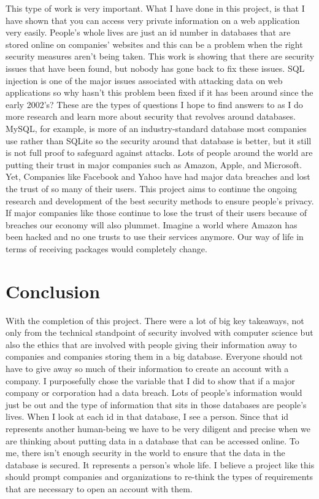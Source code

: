 This type of work is very important. What I have done in this project, is that I have shown that you can access very private information on a web application very easily. People's whole lives are just an id number in databases that are stored online on companies' websites and this can be a problem when the right security measures aren't being taken. This work is showing that there are security issues that have been found, but nobody has gone back to fix these issues. SQL injection is one of the major issues associated with attacking data on web applications so why hasn't this problem been fixed if it has been around since the early 2002's? These are the types of questions I hope to find answers to as I do more research and learn more about security that revolves around databases. MySQL, for example, is more of an industry-standard database most companies use rather than SQLite so the security around that database is better, but it still is not full proof to safeguard against attacks. Lots of people around the world are putting their trust in major companies such as Amazon, Apple, and Microsoft. Yet, Companies like Facebook and Yahoo have had major data breaches and lost the trust of so many of their users. This project aims to continue the ongoing research and development of the best security methods to ensure people's privacy. If major companies like those continue to lose the trust of their users because of breaches our economy will also plummet. Imagine a world where Amazon has been hacked and no one trusts to use their services anymore. Our way of life in terms of receiving packages would completely change.


\section{Conclusion}

With the completion of this project. There were a lot of big key takeaways, not
only from the technical standpoint of security involved with computer science but
also the ethics that are involved with people giving their information away to companies
and companies storing them in a big database. Everyone should not have to give away
so much of their information to create an account with a company. I purposefully chose
the variable that I did to show that if a major company or corporation had a data
breach. Lots of people's information would just be out and the type of information that
sits in those databases are people's lives. When I look at each id in that database, I see a person. Since that id represents another human-being we have to
be very diligent and precise when we are thinking about putting data in a database
that can be accessed online. To me, there isn't enough security in the world to ensure
that the data in the database is secured. It represents a person's whole life. I believe
a project like this should prompt companies and organizations to re-think the types
of requirements that are necessary to open an account with them.

